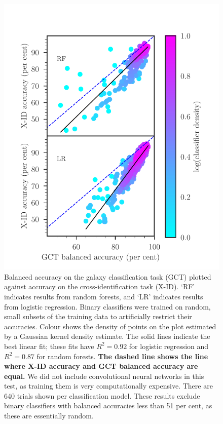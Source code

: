 \documentclass[fleqn,usenatbib,usedcolumn]{mnras}
\newcommand{\edited}[1]{{\bf {#1}}}
\begin{document}
    \begin{figure}
      \centering
      \includegraphics[width=\columnwidth]{images/gct-to-xid.pdf}
      \caption{Balanced accuracy on the galaxy classification task (GCT) plotted
      against accuracy on the cross-identification task (X-ID). `RF' indicates
      results from random forests, and `LR' indicates results from logistic
      regression. Binary classifiers were trained on random, small subsets of the
      training data to artificially restrict their accuracies. Colour shows
      the density of points on the plot estimated by a Gaussian kernel density
      estimate. The solid lines indicate the best linear fit; these fits have
      $R^2 = 0.92$ for logistic regression and $R^2 = 0.87$ for random
      forests.
      \edited{The dashed line shows the line where X-ID accuracy and GCT balanced accuracy are equal.}
       We did not include convolutional neural networks in this test,
      as training them is very computationally expensive. There are 640 trials shown per classification model. These results
      exclude binary classifiers with balanced accuracies less than 51 per cent, as
      these are essentially random.
      \label{fig:gct-to-xid}}
    \end{figure}
\end{document}
